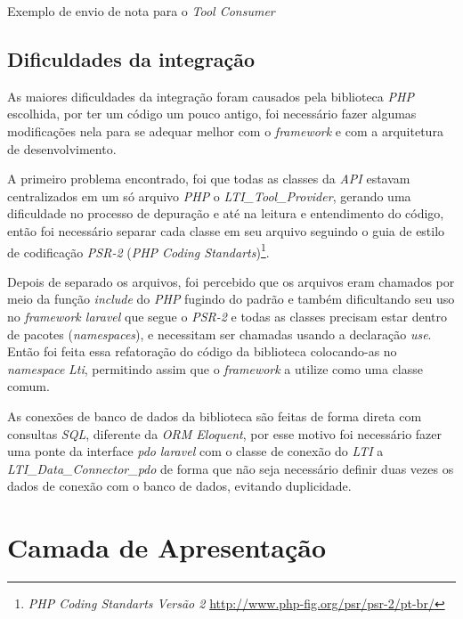 \begin{listing}
    \caption{Exemplo de envio de nota para o \textit{Tool Consumer}}
    \label{lst:lti-outcome}
\end{listing}


\subsection{Dificuldades da integração}

As maiores dificuldades da integração foram causados pela biblioteca \textit{PHP} escolhida, por ter um código um pouco antigo, foi necessário fazer algumas modificações nela para se adequar melhor com o \textit{framework} e com a arquitetura de desenvolvimento.

A primeiro problema encontrado, foi que todas as classes da \textit{API} estavam centralizados em um só arquivo \textit{PHP} o \textit{LTI\_Tool\_Provider}, gerando uma dificuldade no processo de depuração e até na leitura e entendimento do código, então foi necessário separar cada classe em seu arquivo seguindo o guia de estilo de codificação \textit{PSR-2} (\textit{PHP Coding Standarts})\footnote{\textit{PHP Coding Standarts Versão 2} \url{http://www.php-fig.org/psr/psr-2/pt-br/}}.

Depois de separado os arquivos, foi percebido que os arquivos eram chamados por meio da função \textit{include} do \textit{PHP} fugindo do padrão e também dificultando seu uso no \textit{framework laravel} que segue o \textit{PSR-2} e todas as classes precisam estar dentro de pacotes (\textit{namespaces}), e necessitam ser chamadas usando a declaração \textit{use}. Então foi feita essa refatoração do código da biblioteca colocando-as no \textit{namespace} \textit{Lti}, permitindo assim que o \textit{framework} a utilize como uma classe comum.

As conexões de banco de dados da biblioteca são feitas de forma direta com consultas \textit{SQL}, diferente da \textit{ORM Eloquent}, por esse motivo foi necessário fazer uma ponte da interface \textit{pdo} \textit{laravel} com o classe de conexão do \textit{LTI} a \textit{LTI\_Data\_Connector\_pdo} de forma que não seja necessário definir duas vezes os dados de conexão com o banco de dados, evitando duplicidade.

\section{Camada de Apresentação}

